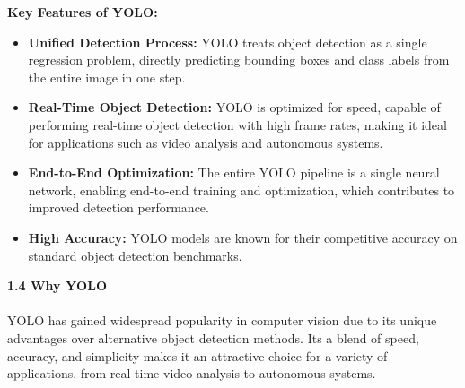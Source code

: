 %
\textbf{Key Features of YOLO: }
  \begin{itemize}
  \item \textbf{Unified Detection Process:} YOLO treats object detection as a single regression problem, directly predicting bounding boxes and class labels from the entire image in one step.
  \item \textbf{Real-Time Object Detection:} YOLO is optimized for speed, capable of performing real-time object detection with high frame rates, making it ideal for applications such as video analysis and autonomous systems.
  \item \textbf{End-to-End Optimization:} The entire YOLO pipeline is a single neural network, enabling end-to-end training and optimization, which contributes to improved detection performance.
  \item \textbf{High Accuracy:} YOLO models are known for their competitive accuracy on standard object detection benchmarks.
  \\
  \end{itemize}
%
{ \textbf{1.4 {Why YOLO}}}\\\\
%
YOLO has gained widespread popularity in computer vision due to its unique advantages over alternative object detection methods. Its a blend of speed, accuracy, and simplicity makes it an attractive choice for a variety of applications, from real-time video analysis to autonomous systems.\\\\\\\\
